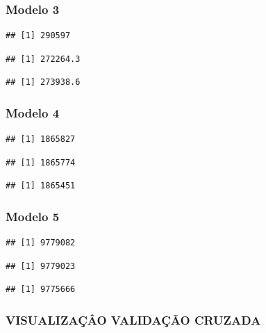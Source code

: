\documentclass[]{article}
\begin{document}
\subsubsection{Modelo 3}\label{modelo-3}

\begin{verbatim}
## [1] 290597
\end{verbatim}

\begin{verbatim}
## [1] 272264.3
\end{verbatim}

\begin{verbatim}
## [1] 273938.6
\end{verbatim}

\subsubsection{Modelo 4}\label{modelo-4}

\begin{verbatim}
## [1] 1865827
\end{verbatim}

\begin{verbatim}
## [1] 1865774
\end{verbatim}

\begin{verbatim}
## [1] 1865451
\end{verbatim}

\subsubsection{Modelo 5}\label{modelo-5}

\begin{verbatim}
## [1] 9779082
\end{verbatim}

\begin{verbatim}
## [1] 9779023
\end{verbatim}

\begin{verbatim}
## [1] 9775666
\end{verbatim}

\subsubsection{VISUALIZAÇÂO VALIDAÇÃO
CRUZADA}\label{visualizacao-validacao-cruzada}
\end{document}
